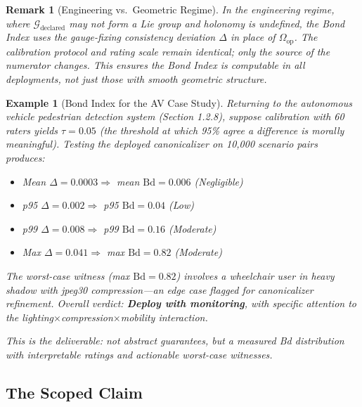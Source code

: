 \documentclass[12pt]{article}
\newtheorem{remark}[theorem]{Remark}
\newtheorem{example}[theorem]{Example}
\begin{document}
\begin{remark}[Engineering vs.\ Geometric Regime]
\emph{In the engineering regime, where $\mathcal{G}_{\text{declared}}$ may
not form a Lie group and holonomy is undefined, the Bond Index uses the gauge-fixing consistency
deviation $\Delta$ in place of $\Omega_{\text{op}}$. The calibration protocol and rating scale remain identical; only the
source of the numerator changes. This ensures the Bond Index is computable in all deployments,
not just those with smooth geometric structure.}
\end{remark}

\begin{example}[Bond Index for the AV Case Study]
\emph{Returning to the autonomous vehicle pedestrian
detection system (Section 1.2.8), suppose calibration with 60 raters yields $\tau = 0.05$ (the threshold at
which 95\% agree a difference is morally meaningful). Testing the deployed canonicalizer on 10,000
scenario pairs produces:}
\begin{itemize}
\item \emph{Mean $\Delta = 0.0003 \Rightarrow$ mean $\mathrm{Bd} = 0.006$ (Negligible)}
\item \emph{p95 $\Delta = 0.002 \Rightarrow$ p95 $\mathrm{Bd} = 0.04$ (Low)}
\item \emph{p99 $\Delta = 0.008 \Rightarrow$ p99 $\mathrm{Bd} = 0.16$ (Moderate)}
\item \emph{Max $\Delta = 0.041 \Rightarrow$ max $\mathrm{Bd} = 0.82$ (Moderate)}
\end{itemize}

\emph{The worst-case witness (max $\mathrm{Bd} = 0.82$) involves a wheelchair user in heavy shadow with jpeg30
compression---an edge case flagged for canonicalizer refinement. Overall verdict: \textbf{Deploy with
monitoring}, with specific attention to the lighting$\times$compression$\times$mobility interaction.}

\emph{This is the deliverable: not abstract guarantees, but a measured Bd distribution with interpretable
ratings and actionable worst-case witnesses.}
\end{example}

\subsection{The Scoped Claim}
\end{document}
